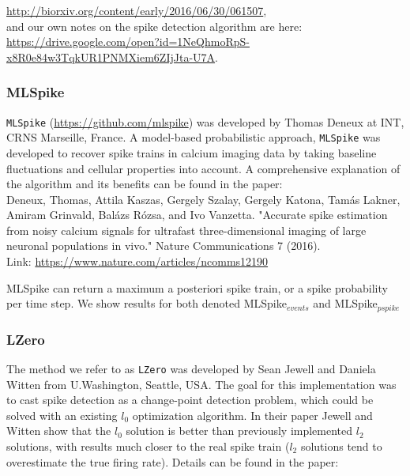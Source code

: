 \documentclass[a4paper,10pt,twocolumn]{article}
\begin{document}
\noindent \href{http://biorxiv.org/content/early/2016/06/30/061507}{http://biorxiv.org/content/early/2016/06/30/061507}, \\

\noindent and our own notes on the spike detection algorithm are here:\\

\noindent \href{https://drive.google.com/open?id=1NeQhmoRpS-x8R0e84w3TqkUR1PNMXiem6ZIjJta-U7A}{https://drive.google.com/open?id=1NeQhmoRpS-x8R0e84w3TqkUR1PNMXiem6ZIjJta-U7A}.

\subsubsection*{MLSpike}
\texttt{MLSpike} (\href{https://github.com/mlspike}{https://github.com/mlspike}) was developed by Thomas Deneux at INT, CRNS Marseille, France. A model-based probabilistic approach, \texttt{MLSpike} was developed to recover spike trains in calcium imaging data by taking baseline fluctuations and cellular properties into account. A comprehensive explanation of the algorithm and its benefits can be found in the paper:\\

\noindent Deneux, Thomas, Attila Kaszas, Gergely Szalay, Gergely Katona, Tamás Lakner, Amiram Grinvald, Balázs Rózsa, and Ivo Vanzetta. "Accurate spike estimation from noisy calcium signals for ultrafast three-dimensional imaging of large neuronal populations in vivo." Nature Communications 7 (2016).\\

\noindent Link: \href{https://www.nature.com/articles/ncomms12190}{https://www.nature.com/articles/ncomms12190}

MLSpike can return a maximum a posteriori spike train, or a spike probability per time step. We show results for both denoted MLSpike$_{events}$ and MLSpike$_{pspike}$

\subsubsection*{LZero}
The method we refer to as \texttt{LZero} was developed by Sean Jewell and Daniela Witten from U.Washington, Seattle, USA. The goal for this implementation was to cast spike detection as a change-point detection problem, which could be solved with an existing $l_{0}$ optimization algorithm. In their paper Jewell and Witten show that the $l_{0}$ solution is better than previously implemented $l_{2}$ solutions, with results much closer to the real spike train ($l_{2}$ solutions tend to overestimate the true firing rate). Details can be found in the paper:\\
\end{document}
